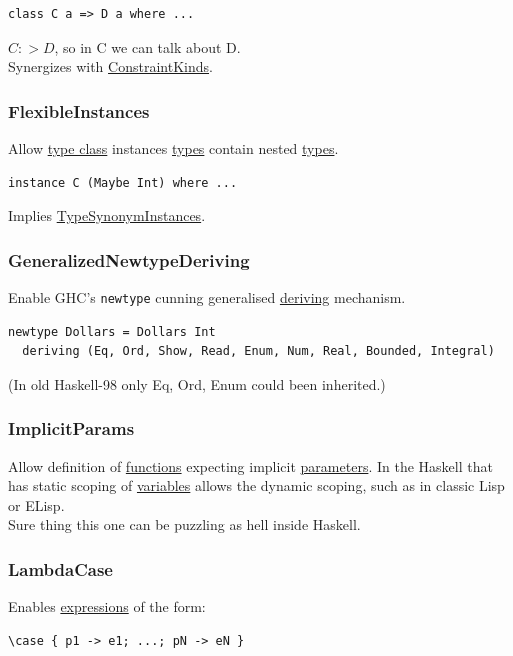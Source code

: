 \documentclass[a4paper,14pt,oneside]{book}
\begin{document}
{\begin{verbatim}
class C a => D a where ...
\end{verbatim}
\(C :> D\), so in C we can talk about D.\\

Synergizes with \hyperref[orgd428fc2]{ConstraintKinds}.\\

\subsubsection{\label{org0f11a39}FlexibleInstances}
\label{sec:org57cf56b}
Allow \hyperref[org6c8048d]{type class} instances \hyperref[org51532d9]{types} contain nested \hyperref[org51532d9]{types}.\\
\begin{verbatim}
instance C (Maybe Int) where ...
\end{verbatim}
Implies \hyperref[org74ec05f]{TypeSynonymInstances}.\\

\subsubsection{\label{orgc3c5eaf}GeneralizedNewtypeDeriving}
\label{sec:org8494a4d}
Enable GHC’s \texttt{newtype} cunning generalised \hyperref[org9b690e2]{deriving} mechanism.\\
\begin{verbatim}
newtype Dollars = Dollars Int
  deriving (Eq, Ord, Show, Read, Enum, Num, Real, Bounded, Integral)
\end{verbatim}
(In old Haskell-98 only Eq, Ord, Enum could been inherited.)\\

\subsubsection{\label{org2f7f7aa}ImplicitParams}
\label{sec:org310a3ce}
Allow definition of \hyperref[orgf33f5fb]{functions} expecting implicit \hyperref[org1f91d4a]{parameters}. In the Haskell that has static scoping of \hyperref[org3e16d0c]{variables} allows the dynamic scoping, such as in classic Lisp or ELisp.\\
Sure thing this one can be puzzling as hell inside Haskell.\\

\subsubsection{\label{orgaebb97a}LambdaCase}
\label{sec:orgf77b847}
Enables \hyperref[org6328353]{expressions} of the form:\\
\begin{verbatim}
\case { p1 -> e1; ...; pN -> eN }


\end{verbatim}}
\end{document}

